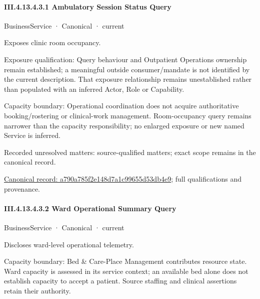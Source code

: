 \paragraph*{III.4.13.4.3.1 Ambulatory Session Status Query}
\label{navigation:III.4.13.4.3.1}

\label{element:a790a785f2e148d7a1c99655d53db4e9}
{\small BusinessService · Canonical · current}\par

Exposes clinic room occupancy.



Exposure qualification: Query behaviour and Outpatient Operations ownership remain established; a meaningful outside consumer/mandate is not identified by the current description. That exposure relationship remains unestablished rather than populated with an inferred Actor, Role or Capability.



Capacity boundary: Operational coordination does not acquire authoritative booking/rostering or clinical-work management. Room-occupancy query remains narrower than the capacity responsibility; no enlarged exposure or new named Service is inferred.


{\small Recorded unresolved matters: source-qualified matters; exact scope remains in the canonical record.}\par
{\footnotesize \href{../../../../../../../continuum/business/business-service/a790a785f2e148d7a1c99655d53db4e9.md}{Canonical record: a790a785f2e148d7a1c99655d53db4e9}; full qualifications and provenance.}\par
\paragraph*{III.4.13.4.3.2 Ward Operational Summary Query}
\label{navigation:III.4.13.4.3.2}

\label{element:55a7f84dfb4142e2aa96c5253b4b6394}
{\small BusinessService · Canonical · current}\par

Discloses ward-level operational telemetry.



Capacity boundary: Bed \& Care-Place Management contributes resource state. Ward capacity is assessed in its service context; an available bed alone does not establish capacity to accept a patient. Source staffing and clinical assertions retain their authority.


